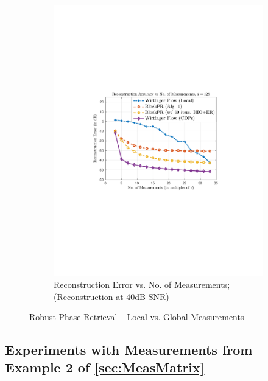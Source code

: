\begin{figure}[hbtp]
\begin{subfigure}[b]{0.8\textwidth}
\centering
\includegraphics[trim = 1.5in 3.5in 1.5in 3.25in,scale=0.8]{pics/fig2b}
\caption{Reconstruction Error vs. No. of Measurements; (Reconstruction at $40$dB SNR)}
\label{fig:WF_meas}
\end{subfigure}
\caption[Local vs. Global Measurements]{Robust Phase Retrieval -- Local vs. Global Measurements}
\label{fig:WF}
\end{figure}
%


\subsection{Experiments with Measurements from Example 2 of \cref{sec:MeasMatrix}}
\label{sec:SparseMeasureMasks}

